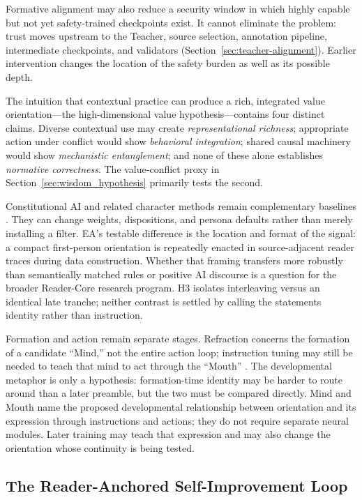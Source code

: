 \documentclass[11pt]{article}
\begin{document}
		Formative alignment may also reduce a security window in which highly capable but not yet safety-trained checkpoints exist. It cannot eliminate the problem: trust moves upstream to the Teacher, source selection, annotation pipeline, intermediate checkpoints, and validators (Section~\ref{sec:teacher-alignment}). Earlier intervention changes the location of the safety burden as well as its possible depth.

		The intuition that contextual practice can produce a rich, integrated value
orientation---the high-dimensional value hypothesis---contains four distinct
claims. Diverse contextual use may create \emph{representational richness}; appropriate action under conflict would show \emph{behavioral integration}; shared causal machinery would show \emph{mechanistic entanglement}; and none of these alone establishes \emph{normative correctness}. The value-conflict proxy in Section~\ref{sec:wisdom_hypothesis} primarily tests the second.

			Constitutional AI and related character methods remain complementary baselines \cite{bai2022constitutional}. They can change weights, dispositions, and persona defaults rather than merely installing a filter. EA's testable difference is the location and format of the signal: a compact first-person orientation is repeatedly enacted in source-adjacent reader traces during data construction. Whether that framing transfers more robustly than semantically matched rules
or positive AI discourse is a question for the broader Reader-Core research
program. H3 isolates interleaving versus an identical late tranche; neither
contrast is settled by calling the statements identity rather than instruction.

			Formation and action remain separate stages. Refraction concerns the
			formation of a candidate ``Mind,'' not the entire action loop; instruction
			tuning may still be needed to teach that mind to act through the ``Mouth''
			\cite{wei2021finetuned}. The developmental metaphor is only a hypothesis:
			formation-time identity may be harder to route around than a later preamble,
			but the two must be compared directly. Mind and Mouth name the proposed
developmental relationship between orientation and its expression through
instructions and actions; they do not require separate neural modules. Later
training may teach that expression and may also change the orientation whose
continuity is being tested.

	\subsection{The Reader-Anchored Self-Improvement Loop}\label{sec:self-improvement}
\end{document}
